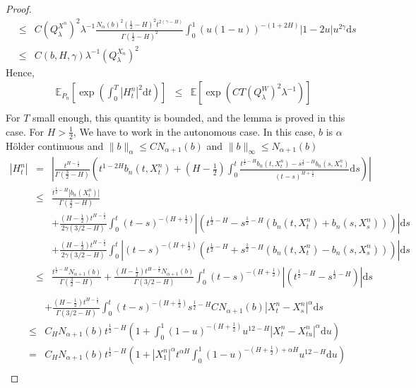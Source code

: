 \documentclass[11pt,a4paper,draft,reqno]{amsart}
\theoremstyle{definition}
\newcommand{\expect}{\mathbb{E}}
\newcommand{\dd}{\mathrm{d}}
\begin{document}
\begin{proof}
\begin{eqnarray*}
&\le&
C\left(Q_\lambda^{X^n}\right)^2\lambda^{-1}\frac{N_\alpha(b)^2\left(\frac12-H\right)^2t^{2(\gamma-H)}}{\Gamma(\frac12 - H)^2}\int_0^1(u(1-u))^{-(1+2H)}\left|1-2u\right|u^{2\gamma}\dd s\\
&\le&
C(b,H,\gamma)\lambda^{-1}\left(Q_\lambda^{X_n}\right)^2
\end{eqnarray*}
Hence, 
\begin{eqnarray*}
\expect_{P_n}\left[\exp\left(\int_0^T\left|H_t^n\right|^2\dd t\right)\right]
&\le&
\expect\left[\exp\left(CT\left(Q_\lambda^{W}\right)^2\lambda^{-1}\right)\right]\\
\end{eqnarray*}
For $T$ small enough, this quantity is bounded, and the lemma is proved in this case. 
For $H>\frac12$, We have to work in the autonomous case. In this case, $b$ is $\alpha$ H\"older continuous and $\|b\|_\alpha\le C N_{\alpha+1}(b)$ and $\|b\|_\infty\le N_{\alpha+1}(b)$
\begin{eqnarray*}
|H_t^n|
&=&
\left|\frac{t^{H-\frac12}}{\Gamma(\frac32-H)}\left(t^{1-2H}b_n(t,X^n_t) + \left(H-\frac12\right)\int_0^t\frac{t^{\frac12-H}b_n(t,X^n_t)-s^{\frac12-H}b_n(s,X^n_s)}{(t-s)^{H+\frac12}}\dd s\right)\right|\\
&\le&
\frac{t^{\frac12 -H}\left|b_n(X^n_t)\right|}{\Gamma(\frac32 - H)}\\
&&
+\frac{(H-\frac12)t^{H-\frac12}}{2\gamma(3/2-H)}\int_{0}^t(t-s)^{-(H+\frac12)}\left|\left(t^{\frac12-H}-s^{\frac12-H}\left(b_n(t,X_t^n)+b_n(s,X_s^n)\right)\right)\right|\dd s\\
&&
+\frac{(H-\frac12)t^{H-\frac12}}{2\gamma(3/2-H)}\int_{0}^t\left|(t-s)^{-(H+\frac12)}\left(t^{\frac12-H}+s^{\frac12-H}\left(b_n(t,X_t^n)-b_n(s,X_s^n)\right)\right)\right|\dd s\\
&\le&
\frac{t^{\frac12 -H}N_{\alpha+1}(b)}{\Gamma(\frac32 - H)}+\frac{(H-\frac12)t^{H-\frac12}N_{\alpha+1}(b)}{\Gamma(3/2-H)}\int_{0}^t(t-s)^{-(H+\frac12)}\left|\left(t^{\frac12-H}-s^{\frac12-H}\right)\right|\dd s\\
\end{eqnarray*}
\begin{eqnarray*}
&&
+\frac{(H-\frac12)t^{H-\frac12}}{\Gamma(3/2-H)}\int_{0}^t(t-s)^{-(H+\frac12)}s^{\frac12-H}CN_{\alpha+1}(b)\left|X^n_t-X^n_s\right|^\alpha\dd s\\
&\le&
C_H N_{\alpha+1}(b)t^{\frac12-H}\left(1 + \int_0^1(1-u)^{-(H+\frac12)}u^{12-H}\left|X^n_t-X^n_{tu}\right|^\alpha\dd u\right)\\
&=&
C_H N_{\alpha+1}(b)t^{\frac12-H}\left(1 + \left|X^n_1\right|^\alpha t^{\alpha H}\int_0^1(1-u)^{-(H+\frac12)+\alpha H}u^{12-H}\dd u\right)\\

\end{eqnarray*}
\end{proof}
\end{document}
